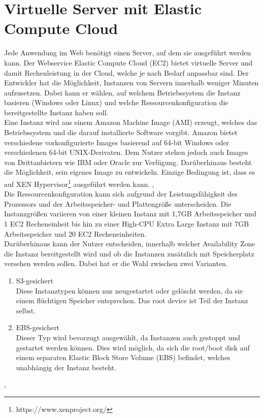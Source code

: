 \section{Virtuelle Server mit Elastic Compute Cloud}
\label{sec:ec2}
Jede Anwendung im Web benötigt einen Server, auf dem sie ausgeführt werden kann. Der Webservice Elastic Compute Cloud (EC2) bietet virtuelle Server und damit Rechenleistung in der Cloud, welche je nach Bedarf anpassbar sind. \cite{aws:ec2}
Der Entwickler hat die Möglichkeit, Instanzen von Servern innerhalb weniger Minuten aufzusetzen. Dabei kann er wählen, auf welchem Betriebssystem die Instanz basieren (Windows oder Linux) und welche Ressourcenkonfiguration die bereitgestellte Instanz haben soll. \cite{aws:ec2} \\

Eine Instanz wird aus einem Amazon Machine Image (AMI) erzeugt, welches das Betriebssystem und die darauf installierte Software vorgibt. Amazon bietet verschiedene vorkonfigurierte Images basierend auf 64-bit Windows oder verschiedenen 64-bit UNIX-Derivaten. Dem Nutzer stehen jedoch auch Images von Drittanbietern wie IBM oder Oracle zur Verfügung. Darüberhinaus besteht die Möglichkeit, sein eigenes Image zu entwickeln. Einzige Bedingung ist, dass es auf XEN Hypervisor\footnote{https://www.xenproject.org/} ausgeführt werden kann. \cite{baun:cloudcomp}, \cite{vliet:resilience} \\

Die Ressourcenkonfiguration kann sich aufgrund der Leistungsfähigkeit des Prozessors und der Arbeitsspeicher- und Plattengröße unterscheiden. Die Instanzgrößen variieren von einer kleinen Instanz mit 1,7GB Arbeitsspeicher und 1 EC2 Recheneinheit bis hin zu einer High-CPU Extra Large Instanz mit 7GB Arbeitsspeicher und 20 EC2 Recheneinheiten. \cite{vliet:resilience} \\

Darüberhinaus kann der Nutzer entscheiden, innerhalb welcher Availability Zone die Instanz bereitgestellt wird und ob die Instanzen zusätzlich mit Speicherplatz versehen werden sollen. Dabei hat er die Wahl zwischen zwei Varianten.
\begin{enumerate}
  \item S3-gesichert \\
  Diese Instanztypen können nur neugestartet oder gelöscht werden, da sie einem flüchtigen Speicher entsprechen. Das root device ist Teil der Instanz selbst.
  \item EBS-gesichert \\
  Dieser Typ wird bevorzugt ausgewählt, da Instanzen auch gestoppt und gestartet werden können. Dies wird möglich, da sich die root/boot disk auf einem separaten Elastic Block Store Volume (EBS) befindet, welches unabhängig der Instanz besteht.
\end{enumerate}
\cite{vliet:resilience}, \cite{aws:ec2} \\

